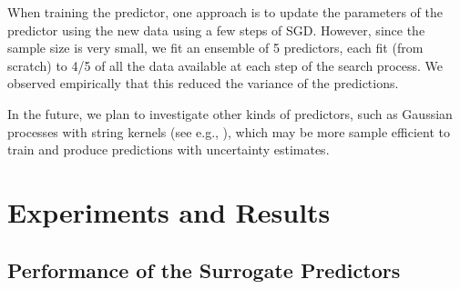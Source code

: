 \documentclass[runningheads]{llncs}
\begin{document}
When training the predictor,
one approach is to
update the parameters of the predictor using the new data
using a few steps of SGD.
However, since the sample size is very small, we fit
an ensemble of 5 predictors, each fit (from scratch)
to 4/5 of all the data available at each step of the search process.
We observed empirically that this reduced the variance of the predictions.


In the future, we plan to investigate other kinds of predictors,
such as Gaussian processes with string kernels (see e.g., \cite{Baisero2015}),
which may be more sample efficient to train and produce predictions with uncertainty estimates.


\section{Experiments and Results}\label{sec:results}\subsection{Performance of the Surrogate Predictors}\label{sec:predictor}
\end{document}
